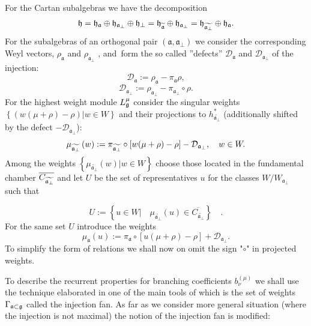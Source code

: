 \documentclass[12pt]{iopart}
\theoremstyle{definition}
\newcommand{\af}{\mathfrak{a}}
\begin{document}
For the Cartan subalgebras we have the decomposition
\begin{equation}
\frak{h}=\frak{\frak{h}_{\af}}\oplus \frak{h}_{\af_{\perp }}\oplus
\frak{h}_{\perp }=\frak{\frak{h}_{\widetilde{\af}}}\oplus \frak{h}_{%
\af_{\perp }}=\frak{\frak{h}_{\widetilde{\af_{\perp }}}}\oplus
\frak{h}_{\af}.
\end{equation}
For the subalgebras of an orthogonal pair $\left( \af,\af_{\perp
}\right) $ we consider the corresponding Weyl vectors, $\rho _{\af}$
and $\rho _{\af_{\perp }}$ , and\ form the so called ''defects'' $%
\mathcal{D}_{\af}$ and $\mathcal{D}_{\af_{\perp }}$ of the
injection:
\begin{equation}
\mathcal{D}_{\af}:=\rho _{\af}-\pi _{\af}\rho ,
\end{equation}
\begin{equation}
\label{defect-perp}
\mathcal{D}_{\af_{\perp }}:=\rho _{\af_{\perp }}-\pi _{\af%
_{\perp }}\circ\rho .
\end{equation}
For the highest weight module $L_{\frak{g}}^{\mu }$ consider the singular
weights $\left\{\left( w(\mu +\rho )-\rho \right)|w  \in W \right\}$ and
their projections to $h_{\widetilde{\af_{\perp }}}^{\ast }$ (additionally
shifted by the defect $-\mathcal{D}_{\af_{\perp }}$):
\begin{equation*}
\mu _{\widetilde{\af_{\perp }}}\left( w\right) :=\pi _{\widetilde{\frak{%
a}_{\perp }}}\circ\left[ w(\mu +\rho )-\rho \right] -\mathcal{D}_{\af_{\perp
}},\quad w\in W.
\end{equation*}
Among the weights $\left\{\mu _{\widetilde{\af_{\perp }}}\left( w\right)
|w\in W\right\}$ choose those located in the fundamental chamber $\overline{C_{%
\widetilde{\af_{\perp }}}}$ and let $U$ be the set of representatives $%
u $ for the classes $W/W_{\af_{\perp }}$ such that

\begin{equation}
U:=\left\{ u\in W|\quad \mu _{\widetilde{\af_{\perp }}}\left( u\right)
\in \overline{C_{\widetilde{\af_{\perp }}}}\right\} \quad .
\label{U-def}
\end{equation}
For the same set $U$ introduce the weights
\begin{equation*}
\mu _{\af}\left( u\right) :=\pi _{\af}\circ\left[ u(\mu +\rho )-\rho %
\right] +\mathcal{D}_{\af_{\perp }}.
\end{equation*}
To simplify the form of relations we shall now on omit the sign "$\circ$" in projected
weights.


To describe the recurrent properties for branching coefficients $b_{\nu
}^{(\mu )}$ we shall use the technique elaborated in \cite{ilyin812pbc} one of the
main tools of which is the set of weights $\Gamma _{\af\subset \frak{g}%
} $ called the injection fan. As far as we consider more general situation
(where the injection is not maximal) the notion of the injection fan is
modified:
\end{document}
